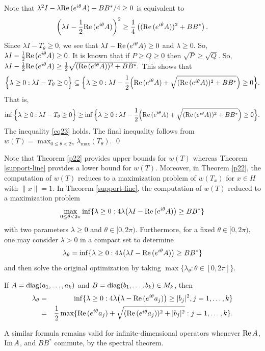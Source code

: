 \documentclass[11pt]{article}
\numberwithin{equation}{section}
\def\diag{{\rm diag}}
\def\re{{\rm Re\,}}
\def\im{{\rm Im\,}}
\begin{document}
Note that $\lambda^2 I - \lambda \re(e^{i\theta} A) -  BB^*/4\ge 0$ is equivalent to
$$\left(\lambda I - \frac{1}{2}\re(e^{i\theta}A)\right)^2
\ge  \frac{1}{4} \left( (\re(e^{i\theta}A))^2 + BB^* \right).$$
Since $\lambda I - T_\theta\ge 0$,
we see that $\lambda I - \re(e^{i\theta}A)\ge 0$ and $\lambda \ge 0$.
So,  $\lambda I - \frac{1}{2}\re(e^{i\theta}A) \ge 0$.
It is  known that if $P \ge  Q \ge 0$ then $\sqrt P \ge \sqrt Q$.
So, $\lambda I - \frac{1}{2}\re(e^{i\theta}A)
\ge \frac{1}{2} \sqrt {(\re(e^{i\theta}  A))^2+BB^*}.$
This shows that
$$\Big\{ \lambda \ge 0:  \lambda I - T_\theta \ge 0\Big\}\subseteq \Big\{ \lambda \ge 0: \lambda I - \frac{1}{2}\Big(\re(e^{i\theta}A)
+ \sqrt {(\re(e^{i\theta}  A))^2+BB^*}\Big)\ge 0\Big\}.$$
That is,
$$\inf \Big\{ \lambda \ge 0:  \lambda I - T_\theta \ge 0\Big\}\ge \inf \Big\{ \lambda \ge 0: \lambda I - \frac{1}{2}\Big(\re(e^{i\theta}A)
+ \sqrt {(\re(e^{i\theta}  A))^2+BB^*}\Big)\ge 0\Big\}.$$
The inequality \eqref{eq23} holds. The final inequality follows from $w(T)=\max_{0\le \theta< 2\pi} \lambda_{\max}(T_{\theta})$.
\qed


\medskip
Note that Theorem \ref{p22} provides upper bounds for $w(T)$ whereas Theorem \ref{support-line} provides a lower bound for $w(T)$. Moreover, in Theorem \ref{p22}, the computation of $w(T)$ reduces to a maximization problem
of $w(T_x)$ for
$x \in H$ with $\|x\| = 1$. In Theorem \ref{support-line}, the computation of $w(T)$ reduced to a
maximization problem
$$\max_{0\le \theta< 2\pi} \inf \{ \lambda \ge 0: 4\lambda\big(\lambda I - \re (e^{i\theta} A)\big)
\ge BB^*\}$$
with two parameters $\lambda \ge 0$ and $\theta \in [0, 2\pi)$. Furthermore,
for a fixed $\theta \in [0, 2\pi)$, one may consider $\lambda > 0$ in a compact set to determine
$$\lambda_\theta = \inf\{\lambda \ge 0:
4\lambda\big(\lambda I - \re (e^{i\theta} A)\big)
\ge BB^*\}$$
and then solve the original optimization by taking $\max\{ \lambda_\theta: \theta \in [0,2\pi]\}$.


\medskip

If $A = \diag(a_1, \dots, a_k)$ and  $B = \diag(b_1, \dots, b_k) \in M_k$, then
\begin{eqnarray*}
\lambda_\theta
&=&  \inf\{ \lambda\ge 0: 4\lambda\big(\lambda - \re(e^{i\theta} a_j) \big)\ge |b_j|^2, j= 1, \dots, k\}\cr
&=&
\frac{1}{2} \max\{ \re(e^{i\theta}a_j) + \sqrt{ (\re(e^{i\theta}a_j))^2 + |b_j|^2}: j = 1, \dots, k\}.
\end{eqnarray*}

A similar formula remains valid for infinite-dimensional operators whenever $\re A$, $\im A$, and $BB^*$ commute, by the spectral theorem.
\end{document}
